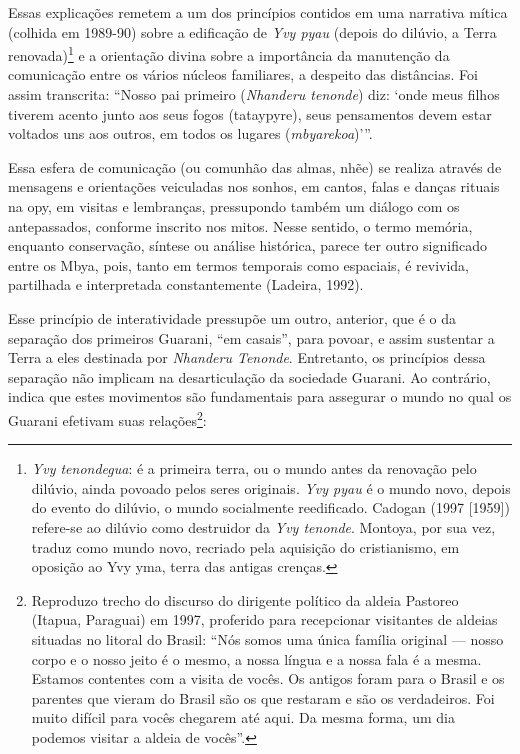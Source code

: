 {{Essas explicações remetem a um dos princípios contidos em uma narrativa
mítica (colhida em 1989-90) sobre a edificação de \emph{Yvy pyau} (depois do
dilúvio, a Terra renovada)\footnote{\emph{Yvy tenondegua}: é a primeira terra,
ou o mundo antes da renovação pelo dilúvio, ainda povoado pelos seres
originais. \emph{Yvy pyau} é o mundo novo, depois do evento do dilúvio, o
mundo socialmente reedificado. Cadogan (1997 [1959]) refere-se ao
dilúvio como destruidor da \emph{Yvy tenonde}. Montoya, por sua vez, traduz
como mundo novo, recriado pela aquisição do cristianismo, em oposição
ao Yvy yma, terra das antigas crenças. } e a orientação divina sobre a
importância da manutenção da comunicação entre os vários núcleos
familiares, a despeito das distâncias. Foi assim transcrita: ``Nosso pai
primeiro (\emph{Nhanderu tenonde}) diz: ‘onde meus filhos tiverem acento junto
aos seus fogos (tataypyre), seus pensamentos devem estar voltados uns
aos outros, em todos os lugares (\emph{mbyarekoa})’''. 

Essa esfera de comunicação (ou comunhão das almas, nhẽe) se
realiza através de mensagens e orientações veiculadas nos sonhos, em
cantos, falas e danças rituais na opy, em visitas e lembranças,
pressupondo também um diálogo com os antepassados, conforme inscrito
nos mitos. Nesse sentido, o termo memória, enquanto conservação,
síntese ou análise histórica, parece ter outro significado entre os
Mbya, pois, tanto em termos temporais como espaciais, é revivida,
partilhada e interpretada constantemente (Ladeira, 1992).  

Esse princípio de interatividade pressupõe um outro, anterior, que é o
da separação dos primeiros Guarani, ``em casais'', para povoar, e assim
sustentar a Terra a eles destinada por \emph{Nhanderu Tenonde}. Entretanto, os
princípios dessa separação não implicam na desarticulação da sociedade
Guarani. Ao contrário, indica que estes movimentos são fundamentais
para assegurar o mundo no qual os Guarani efetivam suas
relações\footnote{Reproduzo trecho do discurso do dirigente político da
aldeia Pastoreo (Itapua, Paraguai) em 1997, proferido para recepcionar
visitantes de aldeias situadas no litoral do Brasil: ``Nós somos uma
única família original --- nosso corpo e o nosso jeito é o mesmo, a nossa
língua e a nossa fala é a mesma. Estamos contentes com a visita de
vocês. Os antigos foram para o Brasil e os parentes que vieram do
Brasil são os que restaram e são os verdadeiros. Foi muito difícil para
vocês chegarem até aqui. Da mesma forma, um dia podemos visitar a
aldeia de vocês''.}:

}}
